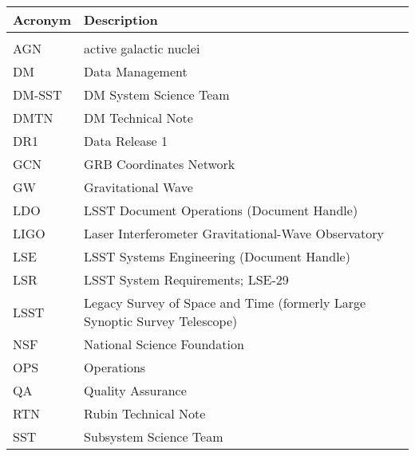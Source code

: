 \addtocounter{table}{-1}
\begin{longtable}{p{}p{}}\hline
\textbf{Acronym} & \textbf{Description}  \\\hline

 &  \\\hline
AGN & active galactic nuclei \\\hline
DM & Data Management \\\hline
DM-SST & DM System Science Team \\\hline
DMTN & DM Technical Note \\\hline
DR1 & Data Release 1 \\\hline
GCN & GRB Coordinates Network \\\hline
GW & Gravitational Wave \\\hline
LDO & LSST Document Operations (Document Handle) \\\hline
LIGO & Laser Interferometer Gravitational-Wave Observatory \\\hline
LSE & LSST Systems Engineering (Document Handle) \\\hline
LSR & LSST System Requirements; LSE-29 \\\hline
LSST & Legacy Survey of Space and Time (formerly Large Synoptic Survey Telescope) \\\hline
NSF & National Science Foundation \\\hline
OPS & Operations \\\hline
QA & Quality Assurance \\\hline
RTN & Rubin Technical Note \\\hline
SST & Subsystem Science Team \\\hline
\end{longtable}
